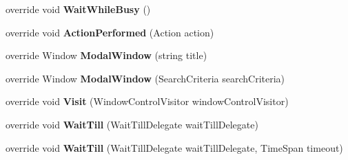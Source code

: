 \begin{DoxyCompactItemize}
\item 
\hypertarget{class_proto_test_1_1_golem_1_1_white_1_1_elements_1_1_white_window_aa9dbcd883c3f0952cbe3856348a8129c}{override void {\bfseries Wait\-While\-Busy} ()}\label{class_proto_test_1_1_golem_1_1_white_1_1_elements_1_1_white_window_aa9dbcd883c3f0952cbe3856348a8129c}

\item 
\hypertarget{class_proto_test_1_1_golem_1_1_white_1_1_elements_1_1_white_window_a8aa10a0742c049abc190b4bbabe1f361}{override void {\bfseries Action\-Performed} (Action action)}\label{class_proto_test_1_1_golem_1_1_white_1_1_elements_1_1_white_window_a8aa10a0742c049abc190b4bbabe1f361}

\item 
\hypertarget{class_proto_test_1_1_golem_1_1_white_1_1_elements_1_1_white_window_a3c7ee4c1de344c9eb6504eb63e09167a}{override Window {\bfseries Modal\-Window} (string title)}\label{class_proto_test_1_1_golem_1_1_white_1_1_elements_1_1_white_window_a3c7ee4c1de344c9eb6504eb63e09167a}

\item 
\hypertarget{class_proto_test_1_1_golem_1_1_white_1_1_elements_1_1_white_window_a2d654e711c460d4c050d46c51f4bb3da}{override Window {\bfseries Modal\-Window} (Search\-Criteria search\-Criteria)}\label{class_proto_test_1_1_golem_1_1_white_1_1_elements_1_1_white_window_a2d654e711c460d4c050d46c51f4bb3da}

\item 
\hypertarget{class_proto_test_1_1_golem_1_1_white_1_1_elements_1_1_white_window_aa859ba279c1ec49aa79cfa9b117940c4}{override void {\bfseries Visit} (Window\-Control\-Visitor window\-Control\-Visitor)}\label{class_proto_test_1_1_golem_1_1_white_1_1_elements_1_1_white_window_aa859ba279c1ec49aa79cfa9b117940c4}

\item 
\hypertarget{class_proto_test_1_1_golem_1_1_white_1_1_elements_1_1_white_window_a69b91381036ec6fe2003314dc5ea9e2f}{override void {\bfseries Wait\-Till} (Wait\-Till\-Delegate wait\-Till\-Delegate)}\label{class_proto_test_1_1_golem_1_1_white_1_1_elements_1_1_white_window_a69b91381036ec6fe2003314dc5ea9e2f}

\item 
\hypertarget{class_proto_test_1_1_golem_1_1_white_1_1_elements_1_1_white_window_a35c2f9df4da4f7afb602d161428b0375}{override void {\bfseries Wait\-Till} (Wait\-Till\-Delegate wait\-Till\-Delegate, Time\-Span timeout)}\label{class_proto_test_1_1_golem_1_1_white_1_1_elements_1_1_white_window_a35c2f9df4da4f7afb602d161428b0375}


\end{DoxyCompactItemize}
